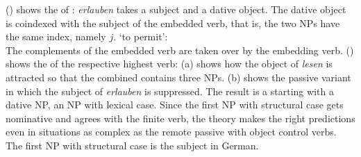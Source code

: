 \noindent
() shows the \argstv of : \emph{erlauben} takes a subject and a dative
object. The dative object is coindexed with the subject of the embedded verb, that is, the two NPs
have the same index, namely $j$.
\ea
{} `to permit':\\
\z
The complements of the embedded verb  are taken over by the embedding verb. () shows
the \argstv of the respective highest verb:
\ea
\label{ex-arg-st-fernpassiv-object-control}
\z
(a) shows how the object of \emph{lesen} is attracted so that the combined \argst contains
three NPs. (b) shows the passive variant in which the subject of \emph{erlauben} is
suppressed. The result is a \argstl starting with a dative NP, an NP with lexical case. Since the
first NP with structural case gets nominative and agrees with the finite verb, the theory makes the
right predictions even in situations as complex as the remote passive with object control verbs. The
first NP with structural case is the subject in German.










